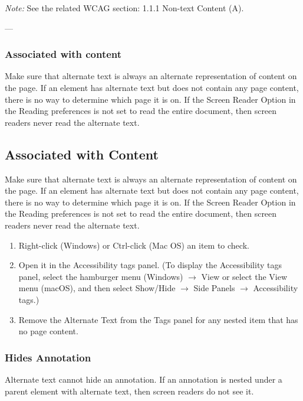 \vspace{0.5em}
\noindent\textit{Note:} See the related WCAG section: 1.1.1 Non-text Content (A)\cite{WCAG}.

---

\subsubsection{Associated with content}
Make sure that alternate text is always an alternate representation of content on the page. If an element has alternate text but does not contain any page content, there is no way to determine which page it is on. If the Screen Reader Option in the Reading preferences is not set to read the entire document, then screen readers never read the alternate text\cite{AdobeHelpX}.

\vfill


\subsection{Associated with Content}
Make sure that alternate text is always an alternate representation of content on the page. If an element has alternate text but does not contain any page content, there is no way to determine which page it is on. If the Screen Reader Option in the Reading preferences is not set to read the entire document, then screen readers never read the alternate text.\cite{WCAG}

\begin{enumerate}
    \item Right-click (Windows) or Ctrl-click (Mac OS) an item to check.
    \item Open it in the Accessibility tags panel. (To display the Accessibility tags panel, select the hamburger menu (Windows) $\rightarrow$ View or select the View menu (macOS), and then select Show/Hide $\rightarrow$ Side Panels $\rightarrow$ Accessibility tags.)
    \item Remove the Alternate Text from the Tags panel for any nested item that has no page content.
\end{enumerate}

\subsubsection{Hides Annotation}
Alternate text cannot hide an annotation. If an annotation is nested under a parent element with alternate text, then screen readers do not see it.\cite{WCAG}

